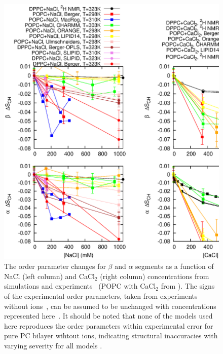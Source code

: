 \documentclass[pre,aps,floatfix,authordate1-4,twocolumn]{revtex4-1}
\begin{document}
\begin{figure}[]
  \centering
  \includegraphics[width=15cm]{../Fig/OrderParameterIONSchanges.eps}
  \caption{\label{ordPions}
    The order parameter changes for $\beta$ and $\alpha$ segments as a function of NaCl (left column) 
    and CaCl$_2$ (right column) concentrations from simulations and experiments~\cite{akutsu81} 
    (POPC with CaCl$_2$ from \cite{altenbach84}). The signs of the experimental order parameters, taken from
    experiments without ions~\cite{hong95a,hong95b,gross97}, can be assumed to be unchanged 
    with concentrations represented here~\cite{altenbach84,ollila15}. It should be noted that
    none of the models used here reproduces the order parameters within experimental error
    for pure PC bilayer wihtout ions, indicating structural inaccuracies with varying severity
    for all models \cite{botan15}.
   }
\end{figure}
\end{document}
